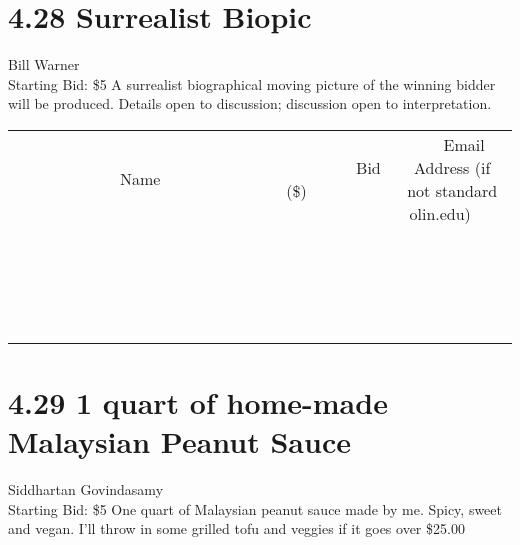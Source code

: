 \documentclass[11pt]{article}
\begin{document}
\section*{4.28 Surrealist Biopic}
Bill Warner
\\
Starting Bid: \$5
\newline
A surrealist biographical moving picture of the winning bidder will be produced. Details open to discussion; discussion open to interpretation.
\\[3ex]
\begin{tabular}{c c c}
~~~~~~~~~~~~~Name~~~~~~~~~~~~~ & ~~~~~~~~~Bid (\$)~~~~~~~~~  & ~~~Email Address (if not standard olin.edu)~~~\\
 & & \\
\hline
 & & \\
\hline
 & & \\
\hline
 & & \\
\hline
 & & \\
\hline
 & & \\
\hline
 & & \\
\hline
 & & \\
\hline
 & & \\
\hline
 & & \\
\hline
 & & \\
\hline
 & & \\
\hline
 & & \\
\hline
 & & \\
\hline
 & & \\
\hline
 & & \\
\hline
 & & \\
\hline
 & & \\
\hline
 & & \\
\hline
\end{tabular}
\newpage
\section*{4.29 1 quart of home-made Malaysian Peanut Sauce}
Siddhartan Govindasamy
\\
Starting Bid: \$5
\newline
One quart of Malaysian peanut sauce made by me. Spicy, sweet and vegan. I'll throw in some grilled tofu and veggies if it goes over \$25.00
\end{document}
